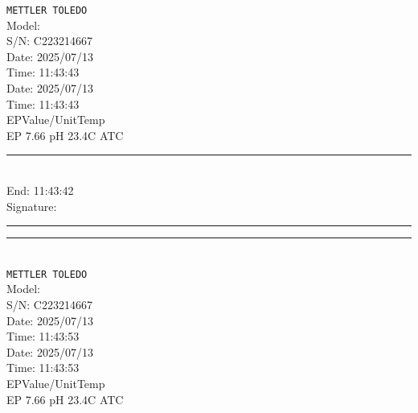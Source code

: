 \documentclass[UTF8,10pt,a4paper,fontset=fandol]{ctexart}
\newcommand{\fieldvalue}[1]{#1}
\begin{document}
\begin{center}
\begin{minipage}{0.32\textwidth}
\small
\texttt{METTLER TOLEDO}\\
Model: \\
S/N:
\fieldvalue{C223214667}\\
Date:
\fieldvalue{2025/07/13}\\
Time:
\fieldvalue{11:43:43}\\[0.5em]

Date:
\fieldvalue{2025/07/13}\\
Time:
\fieldvalue{11:43:43}\\
EP\quad Value/Unit\quad Temp\\
EP
\fieldvalue{7.66 pH}
\quad
\fieldvalue{23.4\textdegree C ATC}\\[0.5em]

\noindent\rule{\linewidth}{0.2pt}\\[-0.2em]
End:
\fieldvalue{11:43:42}\\
Signature: \\
\rule{\linewidth}{0.2pt}

\vspace{1em}
\noindent\rule{\linewidth}{0.2pt}\\[-0.2em]
\texttt{METTLER TOLEDO}\\
Model: \\
S/N:
\fieldvalue{C223214667}\\
Date:
\fieldvalue{2025/07/13}\\
Time:
\fieldvalue{11:43:53}\\[0.5em]

Date:
\fieldvalue{2025/07/13}\\
Time:
\fieldvalue{11:43:53}\\
EP\quad Value/Unit\quad Temp\\
EP
\fieldvalue{7.66 pH}
\quad
\fieldvalue{23.4\textdegree C ATC}\\[0.5em]


\end{minipage}
\end{center}
\end{document}
